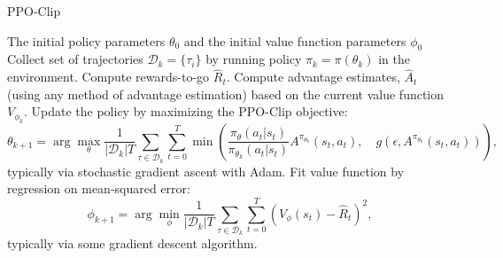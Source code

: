 \documentclass{article}
\begin{document}
\begin{algorithm}
\caption{PPO-Clip}
\begin{algorithmic}[1]
\Require The initial policy parameters $\theta_0$ and the initial value function parameters $\phi_0$
    \State Collect set of trajectories $\mathcal{D}_k = \{\tau_i\}$ by running policy $\pi_k = \pi(\theta_k)$ in the environment.
    \State Compute rewards-to-go $\hat{R}_t$.
    \State Compute advantage estimates, $\hat{A}_t$ (using any method of advantage estimation) based on the current value function $V_{\phi_k}$.
    \State Update the policy by maximizing the PPO-Clip objective:
    $$
    \theta_{k+1} = \arg\max_{\theta} \frac{1}{|\mathcal{D}_k| T} \sum_{\tau \in \mathcal{D}_k} \sum_{t=0}^{T} \min \left( \frac{\pi_\theta(a_t | s_t)}{\pi_{\theta_k}(a_t | s_t)} A^{\pi_{\theta_k}}(s_t, a_t), \quad g(\epsilon, A^{\pi_{\theta_k}}(s_t, a_t)) \right),
    $$
    typically via stochastic gradient ascent with Adam.
    \State Fit value function by regression on mean-squared error:
    $$
    \phi_{k+1} = \arg\min_{\phi} \frac{1}{|\mathcal{D}_k| T} \sum_{\tau \in \mathcal{D}_k} \sum_{t=0}^{T} \left( V_\phi(s_t) - \hat{R}_t \right)^2,
    $$
    typically via some gradient descent algorithm.
\EndFor
\end{algorithmic}
\end{algorithm}

\end{document}
